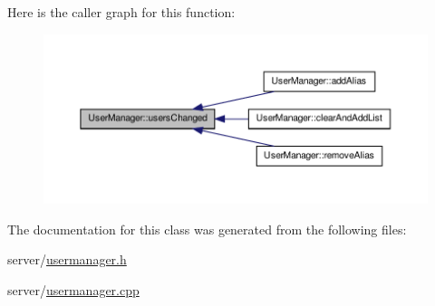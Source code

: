 Here is the caller graph for this function:\nopagebreak
\begin{figure}[H]
\begin{center}
\leavevmode
\includegraphics[width=400pt]{class_user_manager_ac7774b1192a8db594517cf631fe0c08a_icgraph}
\end{center}
\end{figure}




The documentation for this class was generated from the following files:\begin{DoxyCompactItemize}
\item 
server/\hyperlink{usermanager_8h}{usermanager.h}\item 
server/\hyperlink{usermanager_8cpp}{usermanager.cpp}\end{DoxyCompactItemize}
